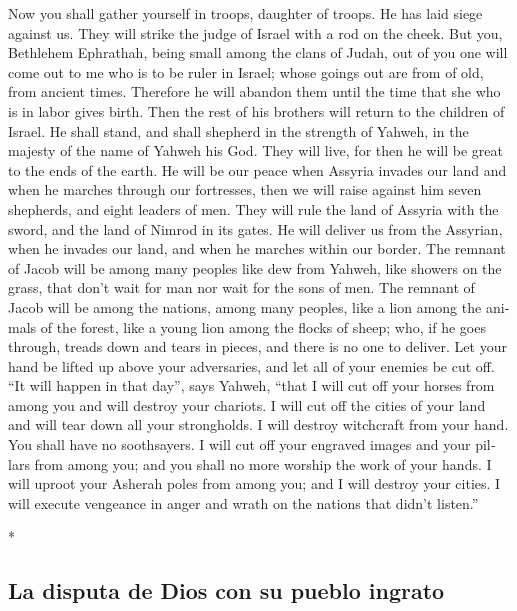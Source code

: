 \begin{paracol}{2}
\begin{otherlanguage}{english}
 Now you shall gather yourself in troops, daughter of
troops. He has laid siege against us. They will strike the judge of
Israel with a rod on the cheek.  But you, Bethlehem
Ephrathah, being small among the clans of Judah, out of you one will
come out to me who is to be ruler in Israel; whose goings out are from
of old, from ancient times.  Therefore he will abandon
them until the time that she who is in labor gives birth. Then the rest
of his brothers will return to the children of Israel.  He
shall stand, and shall shepherd in the strength of Yahweh, in the
majesty of the name of Yahweh his God. They will live, for then he will
be great to the ends of the earth.  He will be our peace
when Assyria invades our land and when he marches through our
fortresses, then we will raise against him seven shepherds, and eight
leaders of men.  They will rule the land of Assyria with
the sword, and the land of Nimrod in its gates. He will deliver us from
the Assyrian, when he invades our land, and when he marches within our
border.  The remnant of Jacob will be among many peoples
like dew from Yahweh, like showers on the grass, that don't wait for man
nor wait for the sons of men.  The remnant of Jacob will
be among the nations, among many peoples, like a lion among the animals
of the forest, like a young lion among the flocks of sheep; who, if he
goes through, treads down and tears in pieces, and there is no one to
deliver.  Let your hand be lifted up above your
adversaries, and let all of your enemies be cut off. 
``It will happen in that day'', says Yahweh, ``that I will cut off your
horses from among you and will destroy your chariots.  I
will cut off the cities of your land and will tear down all your
strongholds.  I will destroy witchcraft from your hand.
You shall have no soothsayers.  I will cut off your
engraved images and your pillars from among you; and you shall no more
worship the work of your hands.  I will uproot your
Asherah poles from among you; and I will destroy your cities.
 I will execute vengeance in anger and wrath on the
nations that didn't listen.''

\end{otherlanguage}

\switchcolumn[0]*

\hypertarget{la-disputa-de-dios-con-su-pueblo-ingrato}{%
\subsection{La disputa de Dios con su pueblo
ingrato}\label{la-disputa-de-dios-con-su-pueblo-ingrato}}


\end{paracol}

